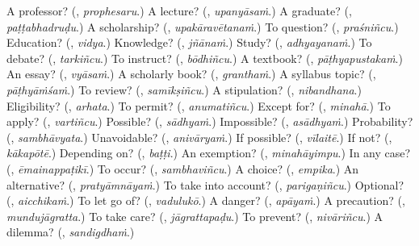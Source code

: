 \begin{tcolorbox}[breakable,colback=teal!4,colframe=teal!35!black,title={Before you move on}]
A professor? (\textbf{}, \emph{prophesaru}.) A lecture? (\textbf{}, \emph{upanyāsaṁ}.) A graduate? (\textbf{}, \emph{paṭṭabhadruḍu}.) A scholarship? (\textbf{}, \emph{upakāravētanaṁ}.) To question? (\textbf{}, \emph{praśniñcu}.) Education? (\textbf{}, \emph{vidya}.) Knowledge? (\textbf{}, \emph{jñānaṁ}.) Study? (\textbf{}, \emph{adhyayanaṁ}.) To debate? (\textbf{}, \emph{tarkiñcu}.) To instruct? (\textbf{}, \emph{bōdhiñcu}.) A textbook? (\textbf{}, \emph{pāṭhyapustakaṁ}.) An essay? (\textbf{}, \emph{vyāsaṁ}.) A scholarly book? (\textbf{}, \emph{granthaṁ}.) A syllabus topic? (\textbf{}, \emph{pāṭhyāṁśaṁ}.) To review? (\textbf{}, \emph{samīkṣiñcu}.) A stipulation? (\textbf{}, \emph{nibandhana}.) Eligibility? (\textbf{}, \emph{arhata}.) To permit? (\textbf{}, \emph{anumatiñcu}.) Except for? (\textbf{}, \emph{minahā}.) To apply? (\textbf{}, \emph{vartiñcu}.) Possible? (\textbf{}, \emph{sādhyaṁ}.) Impossible? (\textbf{}, \emph{asādhyaṁ}.) Probability? (\textbf{}, \emph{sambhāvyata}.) Unavoidable? (\textbf{}, \emph{anivāryaṁ}.) If possible? (\textbf{}, \emph{vīlaitē}.) If not? (\textbf{}, \emph{kākapōtē}.) Depending on? (\textbf{}, \emph{baṭṭi}.) An exemption? (\textbf{}, \emph{minahāyimpu}.) In any case? (\textbf{}, \emph{ēmainappaṭikī}.) To occur? (\textbf{}, \emph{sambhaviñcu}.) A choice? (\textbf{}, \emph{empika}.) An alternative? (\textbf{}, \emph{pratyāmnāyaṁ}.) To take into account? (\textbf{}, \emph{parigaṇiñcu}.) Optional? (\textbf{}, \emph{aicchikaṁ}.) To let go of? (\textbf{}, \emph{vadulukō}.) A danger? (\textbf{}, \emph{apāyaṁ}.) A precaution? (\textbf{}, \emph{mundujāgratta}.) To take care? (\textbf{}, \emph{jāgrattapaḍu}.) To prevent? (\textbf{}, \emph{nivāriñcu}.) A dilemma? (\textbf{}, \emph{sandigdhaṁ}.)
\end{tcolorbox}
